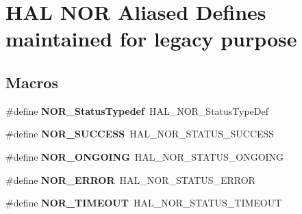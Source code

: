 \hypertarget{group___h_a_l___n_o_r___aliased___defines}{}\section{H\+AL N\+OR Aliased Defines maintained for legacy purpose}
\label{group___h_a_l___n_o_r___aliased___defines}
\subsection*{Macros}
\begin{DoxyCompactItemize}
\item 
\#define {\bfseries N\+O\+R\+\_\+\+Status\+Typedef}~H\+A\+L\+\_\+\+N\+O\+R\+\_\+\+Status\+Type\+Def\hypertarget{group___h_a_l___n_o_r___aliased___defines_ga279519672efdd52720bbf3b701c03286}{}\label{group___h_a_l___n_o_r___aliased___defines_ga279519672efdd52720bbf3b701c03286}

\item 
\#define {\bfseries N\+O\+R\+\_\+\+S\+U\+C\+C\+E\+SS}~H\+A\+L\+\_\+\+N\+O\+R\+\_\+\+S\+T\+A\+T\+U\+S\+\_\+\+S\+U\+C\+C\+E\+SS\hypertarget{group___h_a_l___n_o_r___aliased___defines_ga5f4df82c08207d51443ddd3516510578}{}\label{group___h_a_l___n_o_r___aliased___defines_ga5f4df82c08207d51443ddd3516510578}

\item 
\#define {\bfseries N\+O\+R\+\_\+\+O\+N\+G\+O\+I\+NG}~H\+A\+L\+\_\+\+N\+O\+R\+\_\+\+S\+T\+A\+T\+U\+S\+\_\+\+O\+N\+G\+O\+I\+NG\hypertarget{group___h_a_l___n_o_r___aliased___defines_gac80642cc21e52c08c95cad9bbb1bfe7a}{}\label{group___h_a_l___n_o_r___aliased___defines_gac80642cc21e52c08c95cad9bbb1bfe7a}

\item 
\#define {\bfseries N\+O\+R\+\_\+\+E\+R\+R\+OR}~H\+A\+L\+\_\+\+N\+O\+R\+\_\+\+S\+T\+A\+T\+U\+S\+\_\+\+E\+R\+R\+OR\hypertarget{group___h_a_l___n_o_r___aliased___defines_gab9f3025f50c2dcddae291485261981b0}{}\label{group___h_a_l___n_o_r___aliased___defines_gab9f3025f50c2dcddae291485261981b0}

\item 
\#define {\bfseries N\+O\+R\+\_\+\+T\+I\+M\+E\+O\+UT}~H\+A\+L\+\_\+\+N\+O\+R\+\_\+\+S\+T\+A\+T\+U\+S\+\_\+\+T\+I\+M\+E\+O\+UT\hypertarget{group___h_a_l___n_o_r___aliased___defines_ga3b0bf7d05266f4dfb03d8dcb2093ab07}{}\label{group___h_a_l___n_o_r___aliased___defines_ga3b0bf7d05266f4dfb03d8dcb2093ab07}


\end{DoxyCompactItemize}
